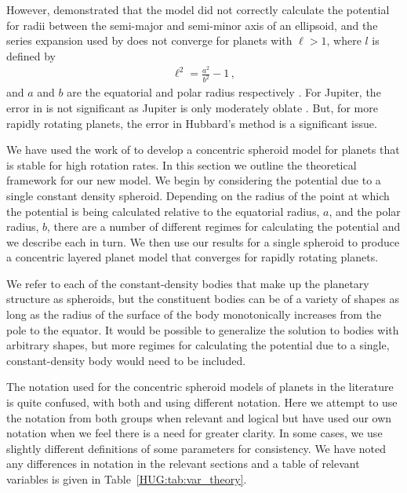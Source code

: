 \documentclass[11pt, oneside]{article}   	%
\begin{document}
However, \cite{Kong2013} demonstrated that the \cite{Hubbard2012} model did not correctly calculate the potential for radii between the semi-major and semi-minor axis of an ellipsoid, and the series expansion used by \cite{Hubbard2012} does not converge for planets with $\ell>1$, where $l$ is defined by
%
\begin{align}
\ell^2 = \frac{a^2}{b^2} -1 \, ,
\end{align}
%
and $a$ and $b$ are the equatorial and polar radius respectively \citep{Hubbard2014}. 
For Jupiter, the error in \cite{Hubbard2012} is not significant as Jupiter is only moderately oblate \citep{Hubbard2014}. But, for more rapidly rotating planets, the error in Hubbard's method is a significant issue.

We have used the work of \cite{Kong2013} to develop a concentric spheroid model for planets that is stable for high rotation rates.
In this section we outline the theoretical framework for our new model.
We begin by considering the potential due to a single constant density spheroid.
Depending on the radius of the point at which the potential is being calculated relative to the equatorial radius, $a$, and the polar radius, $b$, there are a number of different regimes for calculating the potential and we describe each in turn. 
We then use our results for a single spheroid to produce a concentric layered planet model that converges for rapidly rotating planets.

We refer to each of the constant-density bodies that make up the planetary structure as spheroids, but the constituent bodies can be of a variety of shapes as long as the radius of the surface of the body monotonically increases from the pole to the equator.
It would be possible to generalize the solution to bodies with arbitrary shapes, but more regimes for calculating the potential due to a single, constant-density body would need to be included.

%
\vspace{0.5cm}
\begin{tcolorbox}[colback=white, colframe=SchoolColor, title=A note on notation]
The notation used for the concentric spheroid models of planets in the literature is quite confused, with both \cite{Hubbard2012, Hubbard2013} and \cite{Kong2013} using different notation. 
Here we attempt to use the notation from both groups when relevant and logical but have used our own notation when we feel there is a need for greater clarity. 
In some cases, we use slightly different definitions of some parameters for consistency.
We have noted any differences in notation in the relevant sections and a table of relevant variables is given in Table~\ref{HUG:tab:var_theory}.
\end{tcolorbox}
\end{document}
